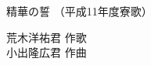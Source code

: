 \documentclass[10pt,b5j]{tarticle} %
\begin{document}
\begin{minipage}[c]{0.7\hsize} %
    \begin{center}
        {\LARGE
            精華の誓 %
        }
        {\small 
            （平成11年度寮歌） %
        }
    \end{center}
\end{minipage}
\begin{minipage}[c]{0.3\hsize} %
    \begin{flushright} %
        荒木洋祐君 作歌\\小出隆広君 作曲 %
    \end{flushright}
\end{minipage}
\end{document}

